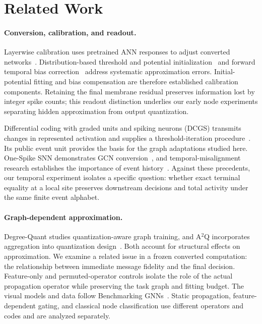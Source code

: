 \documentclass[10pt,twocolumn,letterpaper]{article}
\begin{document}
\section{Related Work}
\paragraph{Conversion, calibration, and readout.}
Layerwise calibration uses pretrained ANN responses to adjust converted networks~\cite{li2021}. Distribution-based threshold and potential initialization~\cite{bojkovic2024} and forward temporal bias correction~\cite{wu2024ftbc} address systematic approximation errors. Initial-potential fitting and bias compensation are therefore established calibration components. Retaining the final membrane residual preserves information lost by integer spike counts; this readout distinction underlies our early node experiments separating hidden approximation from output quantization.

Differential coding with graded units and spiking neurons (DCGS) transmits changes in represented activation and supplies a threshold-iteration procedure~\cite{huang2025}. Its public event unit provides the basis for the graph adaptations studied here. One-Spike SNN demonstrates GCN conversion~\cite{hwang2025onespike}, and temporal-misalignment research establishes the importance of event history~\cite{bojkovic2025}. Against these precedents, our temporal experiment isolates a specific question: whether exact terminal equality at a local site preserves downstream decisions and total activity under the same finite event alphabet.

\paragraph{Graph-dependent approximation.}
Degree-Quant studies quantization-aware graph training, and A$^2$Q incorporates aggregation into quantization design~\cite{degreequant2021,a2q2023}. Both account for structural effects on approximation. We examine a related issue in a frozen converted computation: the relationship between immediate message fidelity and the final decision. Feature-only and permuted-operator controls isolate the role of the actual propagation operator while preserving the task graph and fitting budget. The visual models and data follow Benchmarking GNNs~\cite{dwivedi2023}. Static propagation, feature-dependent gating, and classical node classification use different operators and codes and are analyzed separately.
\end{document}
